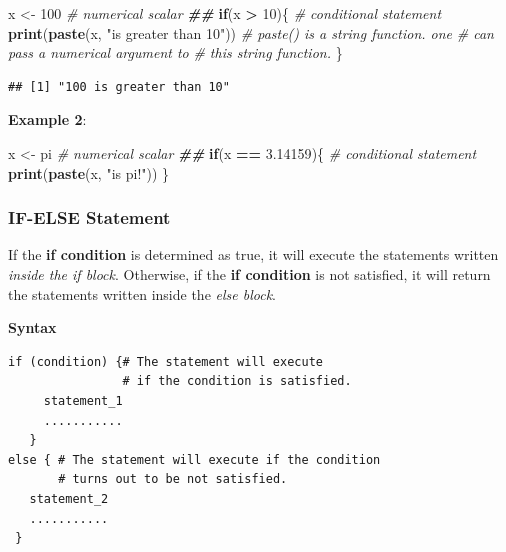 \documentclass[
]{book}
\newenvironment{Shaded}{\begin{snugshade}}{\end{snugshade}}
\newcommand{\CommentTok}[1]{\textcolor[rgb]{0.56,0.35,0.01}{\textit{#1}}}
\newcommand{\ControlFlowTok}[1]{\textcolor[rgb]{0.13,0.29,0.53}{\textbf{#1}}}
\newcommand{\DecValTok}[1]{\textcolor[rgb]{0.00,0.00,0.81}{#1}}
\newcommand{\DocumentationTok}[1]{\textcolor[rgb]{0.56,0.35,0.01}{\textbf{\textit{#1}}}}
\newcommand{\FloatTok}[1]{\textcolor[rgb]{0.00,0.00,0.81}{#1}}
\newcommand{\FunctionTok}[1]{\textcolor[rgb]{0.13,0.29,0.53}{\textbf{#1}}}
\newcommand{\NormalTok}[1]{#1}
\newcommand{\OtherTok}[1]{\textcolor[rgb]{0.56,0.35,0.01}{#1}}
\newcommand{\SpecialCharTok}[1]{\textcolor[rgb]{0.81,0.36,0.00}{\textbf{#1}}}
\newcommand{\StringTok}[1]{\textcolor[rgb]{0.31,0.60,0.02}{#1}}
\begin{document}
\begin{Shaded}
\begin{Highlighting}[]
\NormalTok{x }\OtherTok{\textless{}{-}} \DecValTok{100}                              \CommentTok{\# numerical scalar}
\DocumentationTok{\#\#  }
\ControlFlowTok{if}\NormalTok{(x }\SpecialCharTok{\textgreater{}} \DecValTok{10}\NormalTok{)\{                           }\CommentTok{\# conditional statement}
\FunctionTok{print}\NormalTok{(}\FunctionTok{paste}\NormalTok{(x, }\StringTok{"is greater than 10"}\NormalTok{)) }\CommentTok{\# paste() is a string function. one }
                                      \CommentTok{\# can pass a numerical argument to}
                                      \CommentTok{\# this string function.}
\NormalTok{\}}
\end{Highlighting}
\end{Shaded}

\begin{verbatim}
## [1] "100 is greater than 10"
\end{verbatim}

\textbf{Example 2}:

\begin{Shaded}
\begin{Highlighting}[]
\NormalTok{x }\OtherTok{\textless{}{-}}\NormalTok{ pi                       }\CommentTok{\# numerical scalar}
\DocumentationTok{\#\#  }
\ControlFlowTok{if}\NormalTok{(x }\SpecialCharTok{==} \FloatTok{3.14159}\NormalTok{)\{             }\CommentTok{\# conditional statement}
\FunctionTok{print}\NormalTok{(}\FunctionTok{paste}\NormalTok{(x, }\StringTok{"is pi!"}\NormalTok{))  }
\NormalTok{\}}
\end{Highlighting}
\end{Shaded}

\hypertarget{if-else-statement}{%
\subsubsection{IF-ELSE Statement}\label{if-else-statement}}

If the \textbf{if condition} is determined as true, it will execute the statements written \emph{inside the if block}. Otherwise, if the \textbf{if condition} is not satisfied, it will return the statements written inside the \emph{else block}.

\textbf{Syntax}

\begin{verbatim}
if (condition) {# The statement will execute 
                # if the condition is satisfied.
     statement_1 
     ...........
   }
else { # The statement will execute if the condition 
       # turns out to be not satisfied. 
   statement_2 
   ...........
 }
\end{verbatim}
\end{document}
